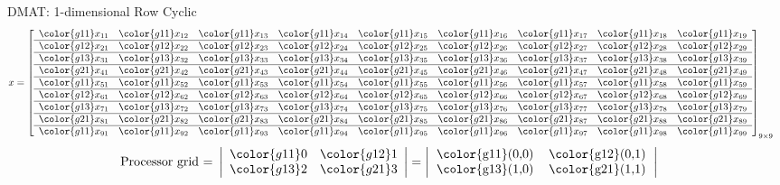\begin{frame}
\begin{exampleblock}{DMAT: 1-dimensional Row Cyclic}
\begin{align*}
x &= \left[
      \begin{array}{lllllllll}
      \color{g11}x_{11} & \color{g11}x_{12} & \color{g11}x_{13} & 
\color{g11}x_{14} & \color{g11}x_{15} & \color{g11}x_{16} & \color{g11}x_{17} & 
\color{g11}x_{18} & \color{g11}x_{19}\\\hline
      \color{g12}x_{21} & \color{g12}x_{22} & \color{g12}x_{23} & 
\color{g12}x_{24} & \color{g12}x_{25} & \color{g12}x_{26} & \color{g12}x_{27} & 
\color{g12}x_{28} & \color{g12}x_{29}\\\hline
      \color{g13}x_{31} & \color{g13}x_{32} & \color{g13}x_{33} & 
\color{g13}x_{34} & \color{g13}x_{35} & \color{g13}x_{36} & \color{g13}x_{37} & 
\color{g13}x_{38} & \color{g13}x_{39}\\\hline
      \color{g21}x_{41} & \color{g21}x_{42} & \color{g21}x_{43} & 
\color{g21}x_{44} & \color{g21}x_{45} & \color{g21}x_{46} & \color{g21}x_{47} & 
\color{g21}x_{48} & \color{g21}x_{49}\\\hline
      \color{g11}x_{51} & \color{g11}x_{52} & \color{g11}x_{53} & 
\color{g11}x_{54} & \color{g11}x_{55} & \color{g11}x_{56} & \color{g11}x_{57} & 
\color{g11}x_{58} & \color{g11}x_{59}\\\hline
      \color{g12}x_{61} & \color{g12}x_{62} & \color{g12}x_{63} & 
\color{g12}x_{64} & \color{g12}x_{65} & \color{g12}x_{66} & \color{g12}x_{67} & 
\color{g12}x_{68} & \color{g12}x_{69}\\\hline
      \color{g13}x_{71} & \color{g13}x_{72} & \color{g13}x_{73} & 
\color{g13}x_{74} & \color{g13}x_{75} & \color{g13}x_{76} & \color{g13}x_{77} & 
\color{g13}x_{78} & \color{g13}x_{79}\\\hline
      \color{g21}x_{81} & \color{g21}x_{82} & \color{g21}x_{83} & 
\color{g21}x_{84} & \color{g21}x_{85} & \color{g21}x_{86} & \color{g21}x_{87} & 
\color{g21}x_{88} & \color{g21}x_{89}\\\hline
      \color{g11}x_{91} & \color{g11}x_{92} & \color{g11}x_{93} & 
\color{g11}x_{94} & \color{g11}x_{95} & \color{g11}x_{96} & \color{g11}x_{97} & 
\color{g11}x_{98} & \color{g11}x_{99}\\
      \end{array}
\right]_{9\times 9}
\end{align*}
\begin{align*}
\text{Processor grid = }\left|
      \begin{array}{ll}
      \color{g11}0 & \color{g12}1 \\
      \color{g13}2 & \color{g21}3
      \end{array}
\right| &= 
\left|
      \begin{tabular}{lll}
      \color{g11}(0,0) & \color{g12}(0,1) \\
      \color{g13}(1,0) & \color{g21}(1,1) 
      \end{tabular}
\right|
\end{align*}
\end{exampleblock}
\end{frame}



